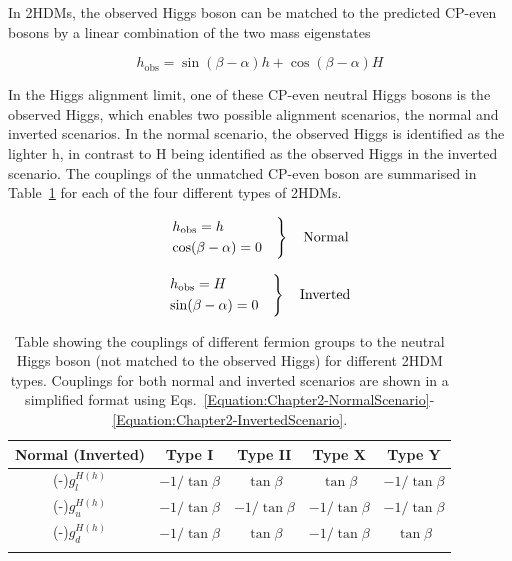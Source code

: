 In 2HDMs, the observed Higgs boson can be matched to the predicted CP-even bosons by a linear combination of the two mass eigenstates 

\begin{equation}
    h_{\text{obs}} = \sin{(\beta - \alpha)} h + \cos{(\beta - \alpha)} H 
\end{equation}

In the Higgs alignment limit, one of these CP-even neutral Higgs bosons is the observed Higgs, which enables two possible alignment scenarios, the normal and inverted scenarios. In the normal scenario, the observed Higgs is identified as the lighter h, in contrast to H being identified as the observed Higgs in the inverted scenario. The couplings of the unmatched CP-even boson are summarised in Table~\ref{Table:Chapter2_2HDM-CouplingsAlignmentLimit} for each of the four different types of 2HDMs.

\begin{equation}
\begin{rcases}
  h_{\text{obs}} = h \\
  \cos(\beta-\alpha) = 0 
\quad \end{rcases}
\quad \text{Normal}
\label{Equation:Chapter2-NormalScenario}
\end{equation}

\begin{equation}
\begin{rcases}
  h_{\text{obs}} = H \\
  \sin(\beta-\alpha) = 0
\quad \end{rcases}
\quad \text{Inverted}
\label{Equation:Chapter2-InvertedScenario}
\end{equation}


\begin{table}[h]
\centering
\renewcommand{\arraystretch}{1.5} %
\setlength{\tabcolsep}{12pt} %
\begin{tabular}{|c|c|c|c|c|}
\hline
Normal (Inverted)     & Type I                     & Type II                     & Type X                                        & Type Y                      \\ \hline \hline
(-)$g_l^{H(h)}$ & $-1/\tan{\beta}$  & $\tan{\beta}$  & $\tan{\beta}$                    & $-1/\tan{\beta}$  \\ \arrayrulecolor{lightgray} \hline
(-)$g_u^{H(h)}$ & $-1/\tan{\beta}$  & $-1/\tan{\beta}$  & $-1/\tan{\beta}$                    & $-1/\tan{\beta}$  \\ \arrayrulecolor{lightgray} \hline
(-)$g_d^{H(h)}$ & $-1/\tan{\beta}$  & $\tan{\beta}$  & $-1/\tan{\beta}$                    & $\tan{\beta}$  \\ \arrayrulecolor{black} \hline
\end{tabular}
\caption{Table showing the couplings of different fermion groups to the neutral Higgs boson (not matched to the observed Higgs) for different 2HDM types. Couplings for both normal and inverted scenarios are shown in a simplified format using Eqs.~\ref{Equation:Chapter2-NormalScenario}-\ref{Equation:Chapter2-InvertedScenario}.}
\label{Table:Chapter2_2HDM-CouplingsAlignmentLimit}
\end{table}


